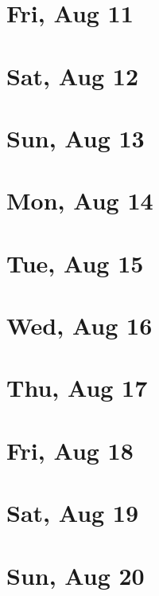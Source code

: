 	\section{Fri, Aug 11}
		
	\section{Sat, Aug 12}
		
	\section{Sun, Aug 13}
		
	\section{Mon, Aug 14}
		
	\section{Tue, Aug 15}
		
	\section{Wed, Aug 16}
		
	\section{Thu, Aug 17}
		
	\section{Fri, Aug 18}
		
	\section{Sat, Aug 19}
		
	\section{Sun, Aug 20}
		
